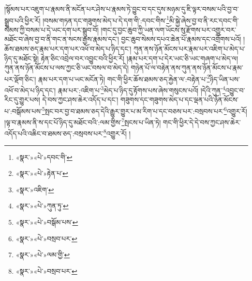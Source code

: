 །སྙོམས་པར་འཇུག་པ་རྣམས་ནི་མངོན་པར་ཤེས་པ་རྣམས་ཏེ་བྱུང་བ་དང་དུས་མཉམ་དུ་ཇི་ལྟར་བསམ་པའི་བྱ་བ་སྒྲུབ་པའི་ཕྱིར་རོ། །བསམ་གཏན་དང་གཟུགས་མེད་པ་དེ་དག་གི་:དབང་གིས་\footnote{«སྣར་»«པེ་»དབང་གི་}མི་སྐྱེ་ཞེས་བྱ་བ་ནི་རང་དབང་གི་སེམས་ཀྱི་བསམ་པ་དེ་ཡང་དག་པར་སྒྲུབ་བོ། །གང་དུ་བྱང་ཆུབ་ཀྱི་ཡན་ལག་ཡོངས་སུ་རྫོགས་པར་འགྱུར་བར་མཐོང་བ་ཞེས་བྱ་བ་ནི་གང་ན་སངས་རྒྱས་རྣམས་དང་། བྱང་ཆུབ་སེམས་དཔའ་ཆེན་པོ་རྣམས་དང་འགྲོགས་པའོ། །ཆོས་ཐམས་ཅད་རྣམ་པར་དག་པར་འཕོ་བ་མེད་པ་ཉིད་དང་། ཀུན་ནས་ཉོན་མོངས་པར་རྣམ་པར་འཇིག་པ་མེད་པ་ཉིད་དུ་མཐོང་སྟེ། རྟེན་ཅིང་འབྲེལ་བར་འབྱུང་བའི་ཕྱིར་རོ། །རྣམ་པར་དག་པ་དེར་ཡང་ཅི་ཡང་གཞག་པ་མེད་ལ། ཀུན་ནས་ཉོན་མོངས་པ་ལས་ཀྱང་ཅི་ཡང་བསལ་བ་མེད་དེ། གཉེན་པོ་ལ་བརྟེན་ནས་ཀུན་ནས་ཉོན་མོངས་པ་རྣམ་པར་ལྡོག་ཅིང་། རྣམ་པར་དག་པ་ཡང་མངོན་ཏེ། གང་གི་ཕྱིར་ཆོས་ཐམས་ཅད་རྐྱེན་ལ་:བརྟེན་པ་\footnote{«སྣར་»«པེ་»རྟེན་པ་}ཉིད་ཡིན་པས་འཕོ་བ་མེད་པ་ཉིད་དང་། རྣམ་པར་:འཇིག་པ་\footnote{«སྣར་»འཇིག་}མེད་པ་ཉིད་དུ་རྟོགས་པས་ཞེས་གསུངས་པའོ། །དེའི་ཀུན་\footnote{«སྣར་»«པེ་»ཀུན་ཏུ་}འབྱུང་བ་རིང་དུ་གྱུར་པས། དེ་བས་ཀྱང་ཤས་ཆེར་འདོད་པ་དང་། གཟུགས་དང་གཟུགས་མེད་པ་དང་ལྡན་པའི་ཉོན་མོངས་པ་:བསྒོམས་པས་\footnote{«སྣར་»«པེ་»བསྒོམ་པས་}སྤང་བར་བྱ་བ་ཐམས་ཅད་དེའི་རྒྱུར་གྱུར་པ་མ་རིག་པ་དང་བཅས་པར་:བསྲབས་པར་\footnote{«སྣར་»«པེ་»བསྲབ་པར་}འགྱུར་རོ། །ལྟ་བ་རྣམས་ནི་ས་དང་པོ་ཉིད་དུ་མཐོང་བའི་:ལམ་གྱིས་\footnote{«སྣར་»«པེ་»ལམ་གྱི་}སྤངས་པ་ཡིན་ཏེ། གང་གི་ཕྱིར་དེ་དེ་བས་ཀྱང་ཤས་ཆེར་འདོད་པའི་འཆིང་བ་ཐམས་ཅད་:བསྲབས་པར་\footnote{«སྣར་»«པེ་»བསྲབ་པར་}འགྱུར་རོ། །
